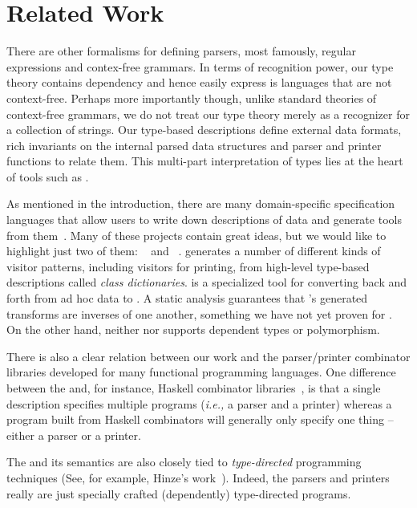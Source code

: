 \section{Related Work}
\label{sec:related}

There are other formalisms for
defining parsers, most famously, regular expressions and contex-free
grammars.  In terms of recognition power, our type theory contains
dependency and hence easily express is languages that are not
context-free.  Perhaps more importantly though, unlike
standard theories of context-free grammars, we do not treat our type
theory merely as a recognizer for a collection of strings.  Our
type-based descriptions define external data formats, rich invariants 
on the internal parsed data structures and parser and printer
functions to relate them.  This
multi-part interpretation of types lies at the heart of 
tools such as \pads{}.

As mentioned in the introduction, there are many domain-specific
specification languages that allow users to write down descriptions
of data and generate tools from them~\cite{gpce02,lieberherr+:class-dictionaries,sigcomm00,fisher+:pads,mandelbaum+:padsml,xsugar2005}.  Many of these projects contain great ideas, 
but we would like to highlight just two of them:
\demeter~\cite{lieberherr+:class-dictionaries} and 
\xsugar~\cite{xsugar2005}.  \demeter{} generates a number of different kinds of visitor patterns, including visitors for printing, from high-level 
type-based descriptions called {\em class dictionaries}.  \xsugar{}
is a specialized tool for converting back and forth from ad hoc data
to \xml.  A static analysis guarantees that \xsugar{}'s generated
transforms are inverses of one another, something we have not yet proven
for \ddc{}.  On the other hand, neither \demeter{} nor \xsugar{} supports
dependent types or polymorphism.

There is also a clear relation between our work and the parser/printer
combinator libraries developed for many functional programming languages.
One difference between the \ddc{} and, for instance, Haskell
combinator libraries~\cite{hutton+:parser-combinators,wadler99prettier}, is that a single \ddc{} description specifies
multiple programs ({\em i.e.,} a parser and a printer) whereas
a program built from Haskell combinators will generally only specify 
one thing -- either a parser or a printer.  

The \ddc{} and its semantics are also closely tied to 
{\em type-directed} programming techniques
(See, for example, Hinze's work~\cite{hinze:generic}).
Indeed, the \ddc{} parsers and printers really are just
specially crafted (dependently) type-directed programs.


